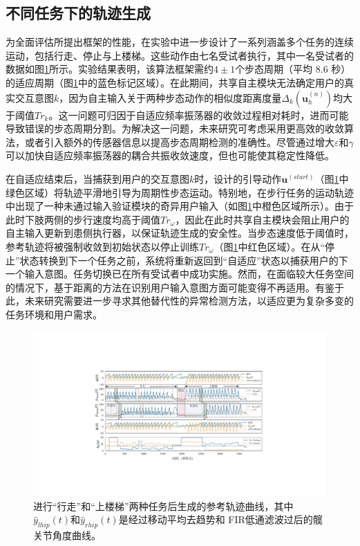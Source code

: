 \subsection{不同任务下的轨迹生成}为全面评估所提出框架的性能，在实验中进一步设计了一系列涵盖多个任务的连续运动，包括行走、停止与上楼梯。这些动作由七名受试者执行，其中一名受试者的数据如图\ref{fig:5-6}所示。实验结果表明，该算法框架需约$4\pm 1$个步态周期（平均 8.6 秒）的适应周期（图\ref{fig:5-6}中的蓝色标记区域）。在此期间，共享自主模块无法确定用户的真实交互意图${k}$，因为自主输入关于两种步态动作的相似度距离度量${\Delta _k}(\pmb{u}_h^{(n)})$均大于阈值$T{r_k}$。这一问题可归因于自适应频率振荡器的收敛过程相对耗时，进而可能导致错误的步态周期分割。为解决这一问题，未来研究可考虑采用更高效的收敛算法，或者引入额外的传感器信息以提高步态周期检测的准确性。尽管通过增大$\varepsilon $和$\gamma $可以加快自适应频率振荡器的耦合共振收敛速度，但也可能使其稳定性降低。

在自适应结束后，当捕获到用户的交互意图${k}$时，设计的引导动作${\pmb{u}^{(start)}}$（图\ref{fig:5-6}中绿色区域）将轨迹平滑地引导为周期性步态运动。特别地，在步行任务的运动轨迹中出现了一种未通过输入验证模块的奇异用户输入（如图\ref{fig:5-6}中橙色区域所示）。由于此时下肢两侧的步行速度均高于阈值$T{r_\omega}$，因此在此时共享自主模块会阻止用户的自主输入更新到患侧执行器，以保证轨迹生成的安全性。当步态速度低于阈值时，参考轨迹将被强制收敛到初始状态以停止训练$T{r_\omega }$（图\ref{fig:5-6}中红色区域）。在从``停止''状态转换到下一个任务之前，系统将重新返回到``自适应''状态以捕获用户的下一个输入意图。任务切换已在所有受试者中成功实施。然而，在面临较大任务空间的情况下，基于距离的方法在识别用户输入意图方面可能变得不再适用。有鉴于此，未来研究需要进一步寻求其他替代性的异常检测方法，以适应更为复杂多变的任务环境和用户需求。
\begin{figure}[htb]
  \centering\includegraphics[width=1\textwidth]{figures/5-Fig-6.pdf}
  \caption{进行“行走”和“上楼梯”两种任务后生成的参考轨迹曲线，其中${\hat y_{lhip}}(t)$和${\hat y_{rhip}}(t)$是经过移动平均去趋势和 FIR低通滤波过后的髋关节角度曲线。}
  \label{fig:5-6}
\end{figure}

